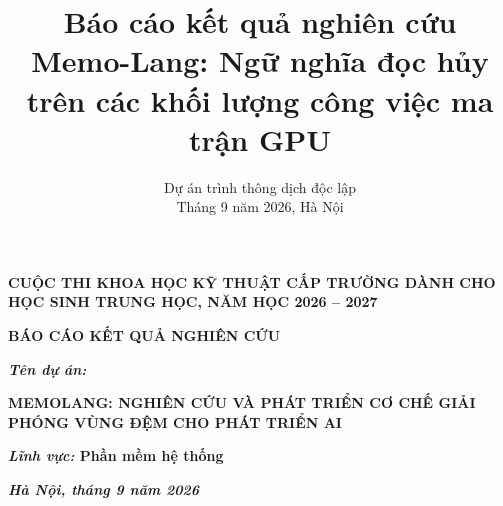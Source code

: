 \documentclass[a4paper]{article}
\begin{document}
	
	\title{Báo cáo kết quả nghiên cứu \\
		{\large Memo-Lang: Ngữ nghĩa đọc hủy trên các khối lượng công việc ma trận GPU}}
	
	\author{
		Dự án trình thông dịch độc lập\\
		Tháng 9 năm 2026, Hà Nội}
	
	\thispagestyle{plain}
	\begin{center}
		\bfseries
		CUỘC THI KHOA HỌC KỸ THUẬT CẤP TRƯỜNG DÀNH CHO HỌC SINH TRUNG HỌC, NĂM HỌC 2026 -- 2027
	\end{center}
	
	\vspace{5cm}
	
	\begin{center}
		\bfseries
		BÁO CÁO KẾT QUẢ NGHIÊN CỨU
	\end{center}
	
	\vspace{3cm}
	
	\begin{center}
		{\Large\bfseries\itshape Tên dự án:}\\[10pt]
		{\Large\bfseries
		\MakeUppercase{MEMOLANG: NGHIÊN CỨU VÀ PHÁT TRIỂN CƠ CHẾ GIẢI PHÓNG VÙNG ĐỆM CHO PHÁT TRIỂN AI}\par}
	\end{center}
	
	\vspace{3cm}
	
	\noindent\textbf{\textit{Lĩnh vực:} Phần mềm hệ thống}
	
	\vspace{6pt}
	
	\vfill
	
	\begin{center}
		\textbf{\textit{Hà Nội, tháng 9 năm 2026}}
	\end{center}
	
	\newpage
	
	\tableofcontents
	
	\listoffigures
	\listoftables
	
\end{document}
